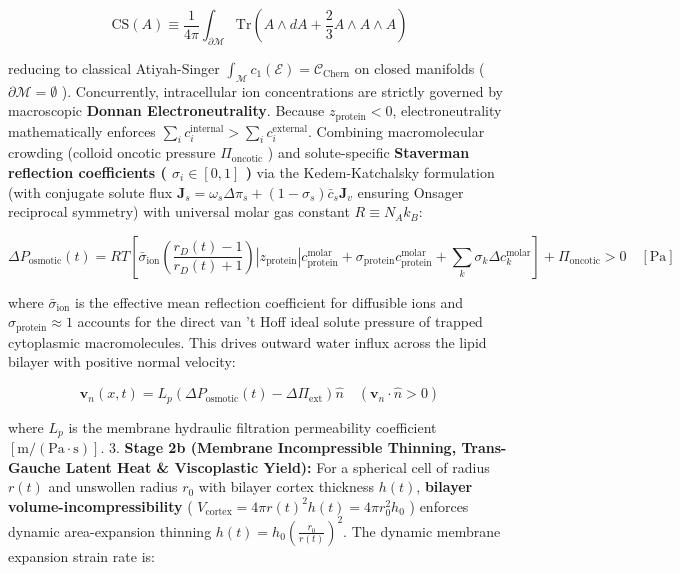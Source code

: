 \documentclass[11pt,a4paper]{article}
\theoremstyle{definition}
\theoremstyle{remark}
\begin{document}
\begin{equation}
\mathrm{CS}(A) \equiv \frac{1}{4\pi}\int_{\partial\mathcal{M}}\mathrm{Tr} \left(A \wedge dA + \frac{2}{3}A \wedge A \wedge A\right)
\end{equation}


reducing to classical Atiyah-Singer $\int_{\mathcal{M}} c_1(\mathcal{E}) = \mathcal{C}_{\text{Chern}}$ on closed manifolds ( $\partial\mathcal{M} = \emptyset$ ).
Concurrently, intracellular ion concentrations are strictly governed by macroscopic \textbf{Donnan Electroneutrality}. Because $z_{\text{protein}} < 0$, electroneutrality mathematically enforces $\sum_i c_i^{\text{internal}} > \sum_i c_i^{\text{external}}$. Combining macromolecular crowding (colloid oncotic pressure $\Pi_{\text{oncotic}}$ ) and solute-specific \textbf{Staverman reflection coefficients ( $\sigma_i \in [0, 1]$ )} via the Kedem-Katchalsky formulation (with conjugate solute flux $\mathbf{J}_s = \omega_s \Delta \pi_s + (1 - \sigma_s)\bar{c}_s \mathbf{J}_v$ ensuring Onsager reciprocal symmetry) with universal molar gas constant $R \equiv N_A k_B$:


\begin{equation}
\boxed{\Delta P_{\text{osmotic}}(t) = R T [ \bar{\sigma}_{\text{ion}} \left(\frac{r_D(t) - 1}{r_D(t) + 1}\right) |z_{\text{protein}}| c_{\text{protein}}^{\text{molar}} + \sigma_{\text{protein}} c_{\text{protein}}^{\text{molar}} + \sum_k \sigma_k \Delta c_k^{\text{molar}} ] + \Pi_{\text{oncotic}} > 0 \quad [\mathrm{Pa}]}
\end{equation}


where $\bar{\sigma}_{\text{ion}}$ is the effective mean reflection coefficient for diffusible ions and $\sigma_{\text{protein}} \approx 1$ accounts for the direct van 't Hoff ideal solute pressure of trapped cytoplasmic macromolecules. This drives outward water influx across the lipid bilayer with positive normal velocity:


\begin{equation}
\mathbf{v}_n(x, t) = L_p \left( \Delta P_{\text{osmotic}}(t) - \Delta \Pi_{\text{ext}} \right) \hat{n} \quad (\mathbf{v}_n \cdot \hat{n} > 0)
\end{equation}


where $L_p$ is the membrane hydraulic filtration permeability coefficient $[\mathrm{m/(Pa \cdot s)}]$.
3. \textbf{Stage 2b (Membrane Incompressible Thinning, Trans-Gauche Latent Heat \& Viscoplastic Yield):}
For a spherical cell of radius $r(t)$ and unswollen radius $r_0$ with bilayer cortex thickness $h(t)$, \textbf{bilayer volume-incompressibility} ( $V_{\text{cortex}} = 4\pi r(t)^2 h(t) = 4\pi r_0^2 h_0$ ) enforces dynamic area-expansion thinning $h(t) = h_0 \left( \frac{r_0}{r(t)} \right)^2$. The dynamic membrane expansion strain rate is:
\end{document}
